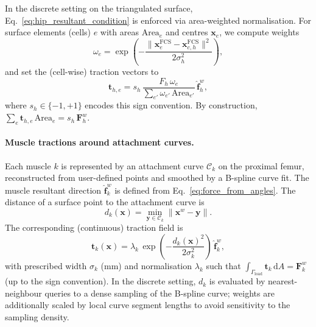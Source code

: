 In the discrete setting on the triangulated surface, Eq.~\eqref{eq:hip_resultant_condition} is enforced via area-weighted normalisation. For surface elements (cells) $e$ with areas $\mathrm{Area}_e$ and centres $\mathbf{x}_e$, we compute weights
\begin{equation}
\omega_e=\exp\!\left(-\frac{\lVert \mathbf{x}_e^{\mathrm{FCS}}-\mathbf{x}_{c,h}^{\mathrm{FCS}}\rVert^2}{2\sigma_h^2}\right),
\end{equation}
and set the (cell-wise) traction vectors to
\begin{equation}
\mathbf{t}_{h,e} = s_h\,\frac{F_h\,\omega_e}{\sum_{e'} \omega_{e'}\,\mathrm{Area}_{e'}}\,\hat{\mathbf{f}}_h^w,
\label{eq:hip_discrete_traction}
\end{equation}
where $s_h\in\{-1,+1\}$ encodes this sign convention. By construction, $\sum_e \mathbf{t}_{h,e}\,\mathrm{Area}_e=s_h\,\mathbf{F}_h^w$.

\paragraph{Muscle tractions around attachment curves.}
Each muscle $k$ is represented by an attachment curve $\mathcal{C}_k$ on the proximal femur, reconstructed from user-defined points and smoothed by a B-spline curve fit. The muscle resultant direction $\hat{\mathbf{f}}_k^w$ is defined from Eq.~\eqref{eq:force_from_angles}. The distance of a surface point to the attachment curve is
\begin{equation}
d_k(\mathbf{x})=\min_{\mathbf{y}\in\mathcal{C}_k}\lVert \mathbf{x}^w-\mathbf{y}\rVert.
\end{equation}
The corresponding (continuous) traction field is
\begin{equation}
\mathbf{t}_k(\mathbf{x})=\lambda_k\,\exp\!\left(-\frac{d_k(\mathbf{x})^2}{2\sigma_k^2}\right)\,\hat{\mathbf{f}}_k^w,
\label{eq:muscle_traction_continuous}
\end{equation}
with prescribed width $\sigma_k$ (mm) and normalisation $\lambda_k$ such that $\int_{\Gamma_{\mathrm{load}}}\mathbf{t}_k\,\mathrm{d}A=\mathbf{F}_k^w$ (up to the sign convention). In the discrete setting, $d_k$ is evaluated by nearest-neighbour queries to a dense sampling of the B-spline curve; weights are additionally scaled by local curve segment lengths to avoid sensitivity to the sampling density.

